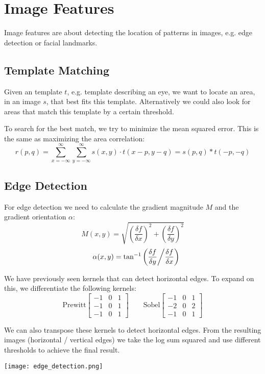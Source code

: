 \section{Image Features}

Image features are about detecting the location of patterns in images, e.g. edge detection or facial landmarks.


\subsection{Template Matching}

Given an template $t$, e.g. template describing an eye, we want to locate an area, in an image $s$, that best fits this template. Alternatively we could also look for areas that match this template by a certain threshold. \medskip

To search for the best match, we try to minimize the mean squared error. This is the same as maximizing the area correlation:
$$r(p, q) = \sum_{x = -\infty}^\infty \sum_{y = -\infty}^\infty s(x,y) \cdot t(x - p, y - q) = s(p,q) * t(-p, -q)$$


\subsection{Edge Detection}

For edge detection we need to calculate the gradient magnitude $M$ and the gradient orientation $\alpha$:
$$M(x,y)=\sqrt{\left(\frac{\delta f}{\delta x}\right)^2+\left(\frac{\delta f}{\delta y}\right)^2}$$ 
$$\quad \alpha (x,y) = \tan^{-1}\left(\frac{\delta f}{\delta y}\middle /\frac{\delta f}{\delta x}\right)$$



We have previously seen kernels that can detect horizontal edges. To expand on this, we differentiate the following kernels:
$$ \text{Prewitt} 
\begin{bmatrix}
    -1 & 0 & 1\\
    -1 & 0 & 1\\
    -1 & 0 & 1
\end{bmatrix}
\qquad
\text{Sobel} 
\begin{bmatrix}
    -1 & 0 & 1\\
    -2 & 0 & 2\\
    -1 & 0 & 1
\end{bmatrix}
$$

We can also transpose these kernels to detect horizontal edges. From the resulting images (horizontal / vertical edges) we take the log sum squared and use different thresholds to achieve the final result.
\begin{center}
	\texttt{[image: edge\_detection.png]}
\end{center}

